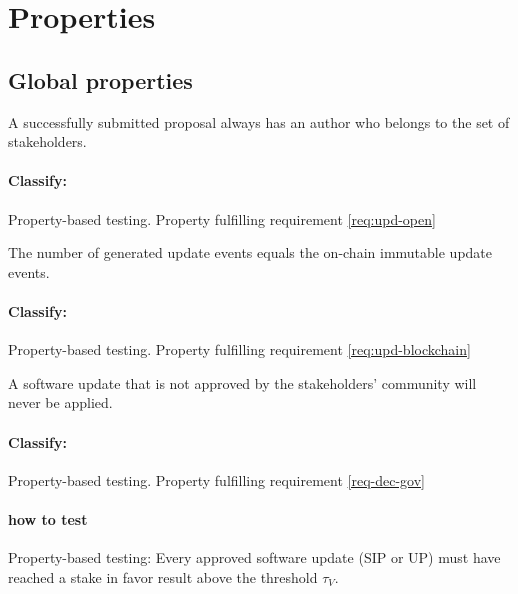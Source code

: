 \section{Properties} \label{sec:cand-properties}

\subsection{Global properties}

\begin{property}\label{prop:submissions-for-all}
  A successfully submitted proposal always has an author who belongs to the set
  of stakeholders.
\end{property}

\paragraph{Classify:} Property-based testing. Property fulfilling requirement
\ref{req:upd-open}

\begin{property}\label{prop:utilize-blockchain}
  The number of generated update events equals the on-chain immutable update
  events.
\end{property}

\paragraph{Classify:} Property-based testing. Property fulfilling requirement
\ref{req:upd-blockchain}

\begin{property}\label{prop:nonapproved-sus}
  A software update that is not approved by the stakeholders' community will
  never be applied.
\end{property}

\paragraph{Classify:} Property-based testing. Property fulfilling requirement
\ref{req-dec-gov}

\paragraph{how to test}
Property-based testing: Every approved software update (SIP or UP) must have
reached a stake in favor result above the threshold $\tau_V$.

